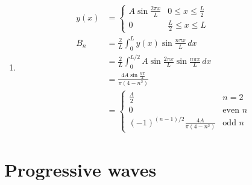 \documentclass{article}
\begin{document}
\begin{enumerate}
  \item

        \begin{align*}
          y(x) & = \begin{cases}
                     A \sin \frac{2 \pi x}{L} & 0 \le x \le \frac{L}{2} \\
                     0                        & \frac{L}{2} \le x \le L
                   \end{cases}                              \\
          B_n  & = \frac{2}{L} \int_0^L y(x) \sin \frac{n \pi x}{L} \,dx                           \\
               & = \frac{2}{L} \int_0^{L / 2} A \sin \frac{2 \pi x}{L} \sin \frac{n \pi x}{L} \,dx \\
               & = \frac{4 A \sin \frac{n \pi}{2}}{\pi (4 - n^2)}                                  \\
               & = \begin{cases}
                     \frac{A}{2}                                  & n = 2          \\
                     0                                            & \text{even } n \\
                     (-1)^{(n - 1) / 2} \frac{4 A}{\pi (4 - n^2)} & \text{odd } n
                   \end{cases}
        \end{align*}
\end{enumerate}

\section{Progressive waves}

\setcounter{subsection}{1}
\subsection{}
\end{document}
